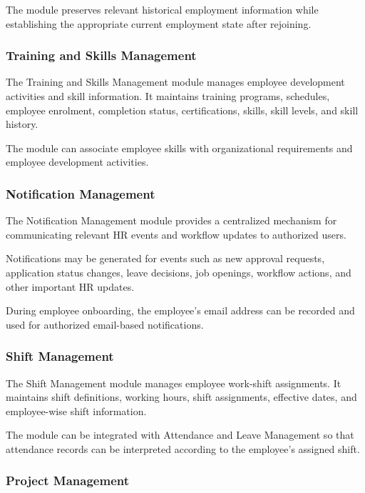 \documentclass[12pt,a4paper]{article}
\begin{document}
The module preserves relevant historical employment information
while establishing the appropriate current employment state after
rejoining.

\subsubsection{Training and Skills Management}

The Training and Skills Management module manages employee
development activities and skill information. It maintains
training programs, schedules, employee enrolment, completion
status, certifications, skills, skill levels, and skill history.

The module can associate employee skills with organizational
requirements and employee development activities.

\subsubsection{Notification Management}

The Notification Management module provides a centralized mechanism
for communicating relevant HR events and workflow updates to
authorized users.

Notifications may be generated for events such as new approval
requests, application status changes, leave decisions, job
openings, workflow actions, and other important HR updates.

During employee onboarding, the employee's email address can be
recorded and used for authorized email-based notifications.

\subsubsection{Shift Management}

The Shift Management module manages employee work-shift
assignments. It maintains shift definitions, working hours, shift
assignments, effective dates, and employee-wise shift information.

The module can be integrated with Attendance and Leave Management
so that attendance records can be interpreted according to the
employee's assigned shift.

\subsubsection{Project Management}
\end{document}
